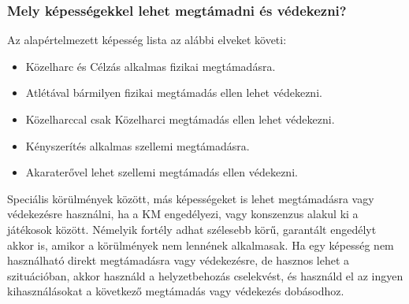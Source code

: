 
\subsubsection{Mely képességekkel lehet megtámadni és védekezni?}

Az alapértelmezett képesség lista az alábbi elveket követi:

\begin{itemize}
    \item Közelharc és Célzás alkalmas fizikai megtámadásra.
    \item Atlétával bármilyen fizikai megtámadás ellen lehet védekezni.
    \item Közelharccal csak Közelharci megtámadás ellen lehet védekezni.
    \item Kényszerítés alkalmas szellemi megtámadásra.
    \item Akaraterővel lehet szellemi megtámadás ellen védekezni.
\end{itemize}

Speciális körülmények között, más képességeket is lehet megtámadásra vagy védekezésre használni, ha a KM engedélyezi, vagy konszenzus alakul ki a játékosok között. Némelyik fortély adhat szélesebb körű, garantált engedélyt akkor is, amikor a körülmények nem lennének alkalmasak. Ha egy képesség nem használható direkt megtámadásra vagy védekezésre, de hasznos lehet a szituációban, akkor használd a helyzetbehozás cselekvést, és használd el az ingyen kihasználásokat a következő megtámadás vagy védekezés dobásodhoz.
